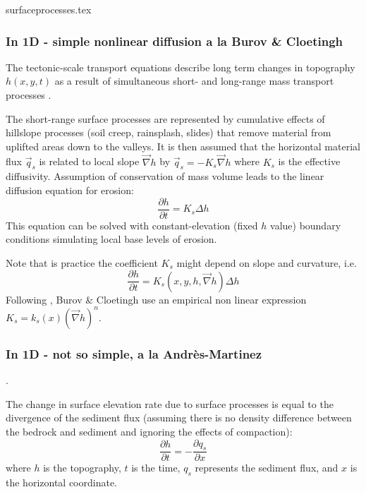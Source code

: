 \begin{flushright} {\tiny {\color{gray} surfaceprocesses.tex}} \end{flushright}

\subsubsection{In 1D - simple nonlinear diffusion a la Burov \& Cloetingh \cite{bucl97}}

The tectonic-scale transport equations describe long term changes
in topography $h(x,y,t)$ as a result of simultaneous short- and long-range
mass transport processes \cite{befh92,kobe94}.

The short-range surface processes are represented by cumulative effects of hillslope 
processes (soil creep, rainsplash, slides) that remove material from uplifted areas 
down to the valleys. 
It is then assumed that the horizontal material flux $\vec{q}_s$ is related to 
local slope $\vec\nabla h$ by $\vec{q}_s=-K_s \vec{\nabla}h$ 
where $K_s$ is the effective diffusivity. Assumption of conservation of mass 
volume leads to the linear diffusion equation for erosion:
\[
\frac{\partial h}{\partial t} = K_s \Delta h
\]
This equation can be solved with constant-elevation (fixed $h$ value)
boundary conditions simulating local base levels of erosion. 

Note that is practice the coefficient $K_s$ might depend on slope and curvature, 
i.e.
\[
\frac{\partial h}{\partial t} = K_s(x,y,h,\vec\nabla h)\Delta h
\]
Following \cite{goss76}, Burov \& Cloetingh use an empirical non linear 
expression $K_s=k_s(x) (\vec\nabla h)^n$. 




\subsubsection{In 1D - not so simple, a la Andr\`es-Martinez \etal\cite{anpa19}}. 

The change in surface elevation rate due to surface processes is equal
to the divergence of the sediment flux 
(assuming there is no density difference between the bedrock and
sediment and ignoring the effects of compaction):
\[
\frac{\partial h}{\partial t} = -\frac{\partial q_s}{\partial x}
\]
where $h$ is the topography, $t$ is the time, $q_s$ represents the sediment flux, 
and $x$ is the horizontal coordinate. 

